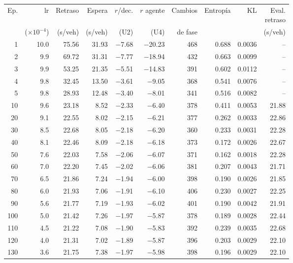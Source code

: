 \begin{table}[H]
\centering
\scriptsize
\setlength{\tabcolsep}{3pt}
\setlength{\tabcolsep}{2pt}
\begin{tabular}{rrrrrrrrrr}
\toprule
Ep. & lr & Retraso & Espera & $r$/dec. & $r$ agente & Cambios & Entropía & KL & \makecell{Eval.\\retraso} \\
 & ($\times 10^{-4}$) & (s/veh) & (s/veh) & (U2) & (U4) & de fase &  &  & (s/veh) \\
\midrule
1 & 10.0 & 75.56 & 31.93 & $-$7.68 & $-$20.23 & 468 & 0.688 & 0.0036 & -- \\
2 & 9.9 & 69.72 & 31.31 & $-$7.77 & $-$18.94 & 432 & 0.663 & 0.0099 & -- \\
3 & 9.9 & 53.25 & 21.35 & $-$5.51 & $-$14.83 & 391 & 0.602 & 0.0112 & -- \\
4 & 9.8 & 32.45 & 13.50 & $-$3.61 & $-$9.05 & 368 & 0.541 & 0.0076 & -- \\
5 & 9.8 & 28.93 & 12.48 & $-$3.40 & $-$8.01 & 341 & 0.516 & 0.0082 & -- \\
10 & 9.6 & 23.18 & 8.52 & $-$2.33 & $-$6.40 & 378 & 0.411 & 0.0053 & 21.88 \\
20 & 9.1 & 22.55 & 8.02 & $-$2.15 & $-$6.21 & 377 & 0.262 & 0.0033 & 22.86 \\
30 & 8.5 & 22.68 & 8.05 & $-$2.18 & $-$6.20 & 360 & 0.233 & 0.0031 & 22.28 \\
40 & 8.1 & 22.46 & 8.09 & $-$2.18 & $-$6.18 & 373 & 0.172 & 0.0026 & 22.67 \\
50 & 7.6 & 22.03 & 7.58 & $-$2.06 & $-$6.07 & 371 & 0.162 & 0.0018 & 22.28 \\
60 & 7.0 & 22.20 & 7.45 & $-$2.02 & $-$6.06 & 381 & 0.207 & 0.0043 & 21.71 \\
70 & 6.5 & 21.86 & 7.24 & $-$1.94 & $-$6.00 & 398 & 0.190 & 0.0026 & 21.85 \\
80 & 6.0 & 21.93 & 7.06 & $-$1.91 & $-$6.10 & 406 & 0.230 & 0.0027 & 22.25 \\
90 & 5.6 & 21.77 & 7.19 & $-$1.93 & $-$6.02 & 401 & 0.190 & 0.0042 & 21.91 \\
100 & 5.0 & 21.42 & 7.26 & $-$1.97 & $-$5.87 & 378 & 0.189 & 0.0028 & 22.44 \\
110 & 4.5 & 21.22 & 7.08 & $-$1.90 & $-$5.83 & 392 & 0.239 & 0.0035 & 22.68 \\
120 & 4.0 & 21.31 & 7.02 & $-$1.89 & $-$5.87 & 396 & 0.203 & 0.0029 & 22.10 \\
130 & 3.6 & 21.75 & 7.38 & $-$1.97 & $-$5.98 & 398 & 0.196 & 0.0029 & 22.10 \\

\end{tabular}
\end{table}
